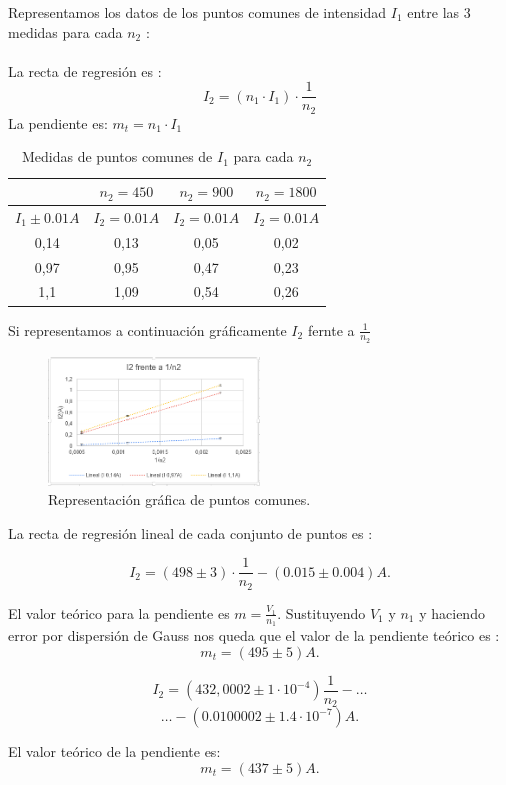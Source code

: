 \documentclass[11pt,letterpaper,twocolumn]{article}
\begin{document}
			Representamos los datos de los puntos comunes de intensidad $I_1$ entre las 3 medidas para cada $n_2$ :\\
\\
La recta de regresión es :
\begin{equation}
	I_2=(n_1\cdot I_1) \cdot \frac{1}{n_2}
\end{equation}
	La pendiente es: $m_t=n_1\cdot I_1$
	
\begin{table}[htbp]
				\caption{Medidas de puntos comunes de $I_1$ para cada $n_2$}
				\begin{tabular}{|c|c|c|c|}
					\hline
					 & $n_2=450$ & $n_2=900$ & $n_2=1800$ \\ \hline
					$I_1 \pm 0.01 A$ & $I_2=0.01 A$ & $I_2=0.01 A$& $ I_2=0.01 A$\\ \hline
					0,14 & 0,13 & 0,05 & 0,02 \\ 
					0,97 & 0,95 & 0,47 & 0,23 \\
					1,1 & 1,09 & 0,54 & 0,26 \\ \hline
				\end{tabular}
				\label{}
			\end{table}
			

			Si representamos a continuación gráficamente $I_2$ fernte a $\frac{1}{n_2}$
			\begin{figure}[H]
				\centering
				\includegraphics[width=0.5\textwidth]{icomun(1).PNG}
				\caption{Representación gráfica de puntos comunes.}
				\label{fig:icomun-1-PNG}
			\end{figure}

		La recta de regresión lineal de cada conjunto de puntos es :
		\begin{tcolorbox}[colback=yellow!5!white,colframe=yellow!75!black,fonttitle=\bfseries,title= \[
		I_1: 1.1A
		.\] ]
		\[
			I_2=\left( 498 \pm 3  \right) \cdot \frac{1}{n_2} - \left( 0.015 \pm 0.004 \right) A
		.\] 	 
	\end{tcolorbox}

		El valor teórico para la pendiente es $m=\frac{V_1}{n_1}$. Sustituyendo $V_1$ y $n_1$ y haciendo error por dispersión de Gauss nos queda que el valor de la pendiente teórico es :
		\[
			m_{t}= (495 \pm 5 ) A
		.\] 
		\begin{tcolorbox}[colback=red!5!white,colframe=red!75!black,fonttitle=\bfseries,title=\[
		I_1 :0.97A 
		.\] ]
		\[
			I_2=\left(  432,0002\pm 1\cdot 10^{-4} \right) \frac{1}{n_2} - \ldots
		\]
		\[
			\ldots-  \left( 0.0100002 \pm 1.4\cdot 10^{-7} \right) A
		.\]  
		\end{tcolorbox}
		El valor teórico de la pendiente es:
		\[
			m_t=(437 \pm 5 )A
		.\] 
\end{document}
